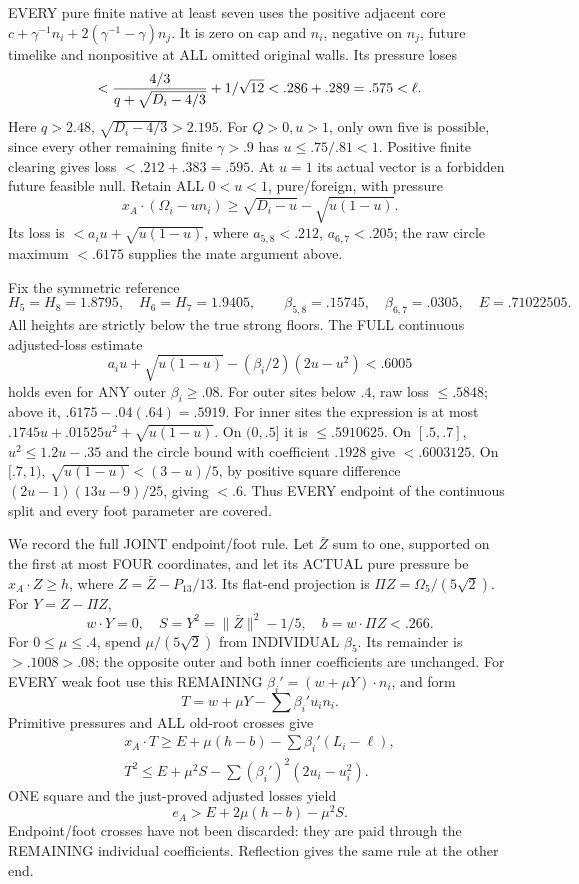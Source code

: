 EVERY pure finite native at least seven uses
the positive adjacent core
\(c+\gamma^{-1}n_i+2(\gamma^{-1}-\gamma)n_j\).
It is zero on cap and \(n_i\), negative on
\(n_j\), future timelike and nonpositive at
ALL omitted original walls.
Its pressure loses
\[
       <{4/3\over q+\sqrt{D_i-4/3}}+1/\sqrt{12}
                        <.286+.289=.575<\ell .
\]
Here \(q>2.48\),
\(\sqrt{D_i-4/3}>2.195\).
For \(Q>0,u>1\), only own five is possible,
since every other remaining finite \(\gamma>.9\)
has \(u\le.75/.81<1\).
Positive finite clearing gives loss
\(<.212+.383=.595\).
At \(u=1\) its actual vector is a forbidden
future feasible null.
Retain ALL \(0<u<1\), pure/foreign, with pressure
\[
 x_A\cdot(\Omega_i-un_i)\ge
                   \sqrt{D_i-u}-\sqrt{u(1-u)} .
\]
Its loss is \(<a_i u+\sqrt{u(1-u)}\), where
\(a_{5,8}<.212\), \(a_{6,7}<.205\);
the raw circle maximum \(<.6175\) supplies
the mate argument above.

Fix the symmetric reference
\[
 H_5=H_8=1.8795,\quad H_6=H_7=1.9405,\qquad
 \beta_{5,8}=.15745,\quad\beta_{6,7}=.0305,
 \quad E=.71022505 .
\]
All heights are strictly below the true
strong floors.
The FULL continuous adjusted-loss estimate
\[
 a_i u+\sqrt{u(1-u)}-(\beta_i/2)(2u-u^2)<.6005
\]
holds even for ANY outer \(\beta_i\ge.08\).
For outer sites below \(.4\), raw loss
\(\le.5848\); above it,
\(.6175-.04(.64)=.5919\).
For inner sites the expression is at most
\(.1745u+.01525u^2+\sqrt{u(1-u)}\).
On \((0,.5]\) it is \(\le.5910625\).
On \([.5,.7]\), \(u^2\le1.2u-.35\)
and the circle bound with coefficient \(.1928\)
give \(<.6003125\).
On \([.7,1)\),
\(\sqrt{u(1-u)}<(3-u)/5\),
by positive square difference
\((2u-1)(13u-9)/25\), giving \(<.6\).
Thus EVERY endpoint of the continuous split
and every foot parameter are covered.

We record the full JOINT endpoint/foot rule.
Let \(\bar Z\) sum to one, supported on the
first at most FOUR coordinates, and let its
ACTUAL pure pressure be \(x_A\cdot Z\ge h\),
where \(Z=\bar Z-P_{13}/13\).
Its flat-end projection is
\(\Pi Z=\Omega_5/(5\sqrt2)\).
For \(Y=Z-\Pi Z\),
\[
 w\cdot Y=0,\quad S=Y^2=\|\bar Z\|^2-1/5,\quad
                         b=w\cdot\Pi Z<.266 .
\]
For \(0\le\mu\le.4\), spend
\(\mu/(5\sqrt2)\) from INDIVIDUAL \(\beta_5\).
Its remainder is \(>.1008>.08\); the opposite
outer and both inner coefficients are unchanged.
For EVERY weak foot use this REMAINING
\(\beta_i'=(w+\mu Y)\cdot n_i\), and form
\[
                    T=w+\mu Y-\sum\beta_i' u_i n_i .
\]
Primitive pressures and ALL old-root crosses give
\[
 \begin{gathered}
 x_A\cdot T\ge E+\mu(h-b)-\sum\beta_i'(L_i-\ell),\\
 T^2\le E+\mu^2S-\sum(\beta_i')^2(2u_i-u_i^2).
 \end{gathered}
\]
ONE square and the just-proved adjusted losses
yield
\[
                           e_A>E+2\mu(h-b)-\mu^2S .
\tag{A12P}\label{eq:arithA12endpointpayment}
\]
Endpoint/foot crosses have not been discarded:
they are paid through the REMAINING individual
coefficients.
Reflection gives the same rule at the other end.

